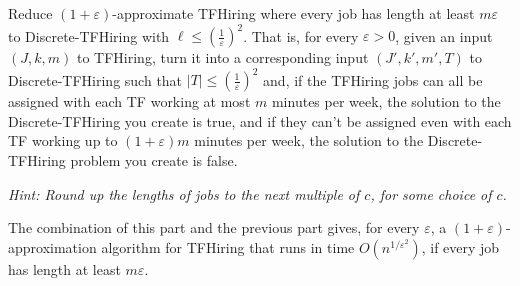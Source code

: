 \documentclass[11pt,letterpaper]{article}
\begin{document}
\begin{problem}
\begin{enumerate}[(a)]
        Reduce $(1+\varepsilon)$-approximate \textsf{TFHiring} where every job has length at least $m \varepsilon$ to \textsf{Discrete-TFHiring} with $\ell \leq (\frac{1}{\varepsilon})^2$. That is, for every $\varepsilon > 0$, given an input $(J, k, m)$ to \textsf{TFHiring}, turn it into a corresponding input $(J', k', m', T)$ to \textsf{Discrete-TFHiring} such that $|T| \leq (\frac{1}{\varepsilon})^2$ and, if the \textsf{TFHiring} jobs can all be assigned with each TF working at most $m$ minutes per week, the solution to the \textsf{Discrete-TFHiring} you create is true, and if they can't be assigned even with each TF working up to $(1+\varepsilon)m$ minutes per week, the solution to the \textsf{Discrete-TFHiring} problem you create is false.

        \emph{Hint: Round up the lengths of jobs to the next multiple of $c$, for some choice of $c$. }
    
        The combination of this part and the previous part gives, for every $\varepsilon$, a $(1+\varepsilon)$-approximation algorithm for \textsf{TFHiring} that runs in time $O(n^{1/\varepsilon^2})$, if every job has length at least $m \varepsilon$.    
    \end{enumerate}
\end{problem}
\end{document}
